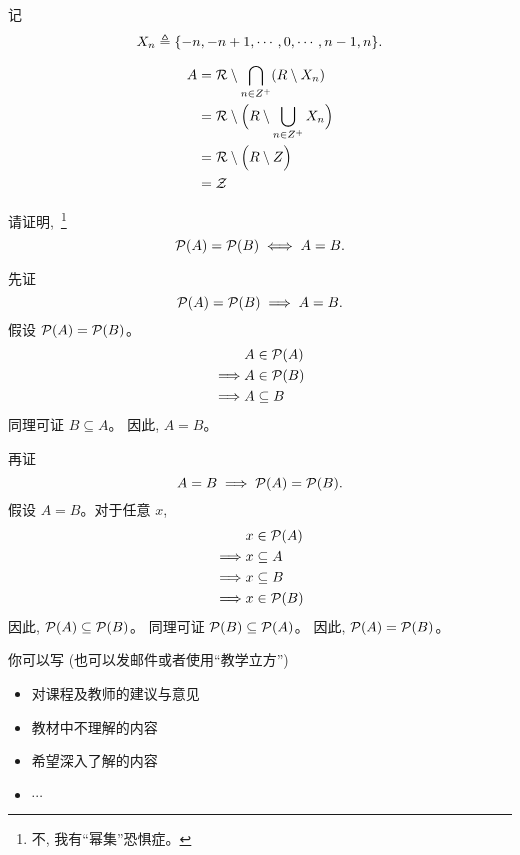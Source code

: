 \documentclass[a4paper, justified]{tufte-handout}
\begin{document}
\begin{solution}
  记
  \[
    X_n \triangleq \{-n, -n+1, \cdots, 0, \cdots, n-1, n\}.
  \]

  \setcounter{equation}{0}
  \begin{align}
    A &= \mathcal{R} \setminus \bigcap_{n \in Z^{+}} (R \setminus X_n) \\
    &= \mathcal{R} \setminus \Big(R \setminus \bigcup_{n \in Z^{+}} X_n \Big) \\
    &= \mathcal{R} \setminus \Big(R \setminus Z \Big) \\
    &= \mathcal{Z}
  \end{align}
\end{solution}

\begin{problem}
  请证明,~\footnote{不, 我有``幂集''恐惧症。}
  \[
    \mathcal{P}(A) = \mathcal{P}(B) \iff A = B.
  \]
\end{problem}

\begin{solution}
  先证
  \[
    \mathcal{P}(A) = \mathcal{P}(B) \implies A = B.
  \]
  假设 $\mathcal{P}(A) = \mathcal{P}(B)$。
  \begin{align*}
    &A \in \mathcal{P}(A) \\
    \implies &A \in \mathcal{P}(B) \\
    \implies &A \subseteq B
  \end{align*}
  同理可证 $B \subseteq A$。
  因此, $A = B$。

  \noindent 再证
  \[
    A = B \implies \mathcal{P}(A) = \mathcal{P}(B).
  \]
  假设 $A = B$。对于任意 $x$,
  \begin{align*}
    &x \in \mathcal{P}(A) \\
    \implies &x \subseteq A \\
    \implies &x \subseteq B \\
    \implies &x \in \mathcal{P}(B)
  \end{align*}
  因此, $\mathcal{P}(A) \subseteq \mathcal{P}(B)$。
  同理可证 $\mathcal{P}(B) \subseteq \mathcal{P}(A)$。
  因此, $\mathcal{P}(A) = \mathcal{P}(B)$。
\end{solution}


\begincorrection

\beginfb

你可以写 (也可以发邮件或者使用``教学立方'')
\begin{itemize}
  \item 对课程及教师的建议与意见
  \item 教材中不理解的内容
  \item 希望深入了解的内容
  \item $\cdots$
\end{itemize}
\end{document}

